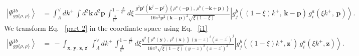 \documentclass[aps,prd,amsmath,amssymb,nofootinbib]{revtex4-2}
\numberwithin{equation}{section}
\begin{document}
\begin{align}\label{part 2}
\left|\Psi_{gg\{\rho,\rho\}}^{1b}\right\rangle &= \int_{\Lambda}^{\vee}dk^{+}\,\int d^{2}\mathbf{k}\, d^{2}\mathbf{p}\,\int_{\frac{\Lambda}{k^{+}}}^{1-\frac{\Lambda}{k^{+}}}d\xi\,\frac{g^{2}\mathbf{p}^{i}\left(\mathbf{k}^{j}-\mathbf{p}^{j}\right)\left\{ \rho^{a}(-\mathbf{p}),\,\rho^{b}(-\mathbf{k}+\mathbf{p})\right\} }{16\pi^{3}\mathbf{p}^{2}(\mathbf{k}-\mathbf{p})^{2}\sqrt{\xi(1-\xi)}}  \left|g_{j}^{b}((1-\xi)k^{+},\,\mathbf{k}-\mathbf{p})\,g_{i}^{a}(\xi k^{+},\,\mathbf{p})\right\rangle.
\end{align}
We transform Eq.~ \eqref{part 2} in the coordinate space using Eq.~ \eqref{i1}
\begin{align}\label{gg_rhorho}
\left|\Psi_{gg\{\rho,\rho\}}^{1b}\right\rangle &=\,-\int_{\mathbf{x},\,\mathbf{y},\,\mathbf{z},\,\mathbf{z}^{\prime}}\int_{\Lambda}^{\vee}dk^{+}\,\int_{\frac{\Lambda}{k^{+}}}^{1-\frac{\Lambda}{k^{+}}}d\xi\frac{g^{2}\left\{ \rho^{a}(\mathbf{y}),\,\rho^{b}(\mathbf{x})\right\} (y-z)^{i}(x-z^{\prime})^{j}}{16\pi^{3}\sqrt{\xi(1-\xi)}(y-z)^{2}(x-z^{\prime})^{2}}\left|g_{j}^{b}((1-\xi)k^{+},\mathbf{z}^{\prime})\, g_{i}^{a}(\xi k^{+},\mathbf{z})\right\rangle .
\end{align}
\end{document}
